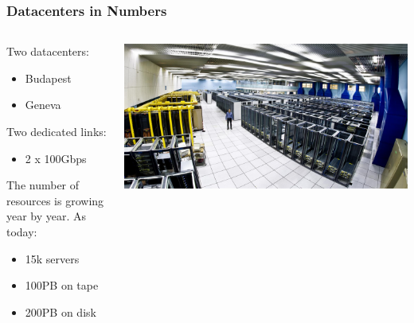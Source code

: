 \documentclass[aspectratio=169]{beamer}
\begin{document}
\begin{frame}
    \frametitle{Datacenters in Numbers}
    \begin{minipage}[t]{0.95\textwidth}
        \begin{columns}[T]
            \begin{column}{0.5\textwidth}
                Two datacenters:
                \begin{itemize}
                    \item Budapest
                    \item Geneva
                \end{itemize}
                Two dedicated links:
                \begin{itemize}
                    \item 2 x 100Gbps
                \end{itemize}
                \vspace{0.1in}
                The number of resources is growing year by year.
                As today:
                \begin{itemize}
                    \item 15k servers
                    \item 100PB on tape
                    \item 200PB on disk
                \end{itemize}
            \end{column}
            \begin{column}{0.5\textwidth}
                \vspace{0.2in}
                \includegraphics[width=1.1\textwidth]{DC_overview.png}
            \end{column}
        \end{columns}
    \end{minipage}
\end{frame}
\end{document}

